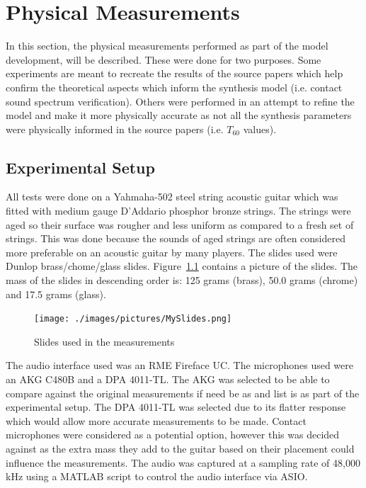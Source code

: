 \documentclass[../main.tex]{subfiles}
\begin{document}
\chapter{Physical Measurements}
In this section, the physical measurements performed as part of the model development, will be described. These were done for two purposes. Some experiments are meant to recreate the results of the source papers which help confirm the theoretical aspects which inform the synthesis model (i.e. contact sound spectrum verification). Others were performed in an attempt to refine the model and make it more physically accurate as not all the synthesis parameters were physically informed in the source papers (i.e. $T_{60}$ values).

\section{Experimental Setup}
All tests were done on a Yahmaha-502 steel string acoustic guitar which was fitted with medium gauge D'Addario phosphor bronze strings. The strings were aged so their surface was rougher and less uniform as compared to a fresh set of strings. This was done because the sounds of aged strings are often considered more preferable on an acoustic guitar by many players. The slides used were Dunlop brass/chome/glass slides. Figure~\ref{fig:MySlides} contains a picture of the slides. The mass of the slides in descending order is: 125 grams (brass), 50.0 grams (chrome) and 17.5 grams (glass). 

\begin{figure}[h]
    \centering
    \texttt{[image: ./images/pictures/MySlides.png]}
    \caption{Slides used in the measurements}
    \label{fig:MySlides}
\end{figure}

The audio interface used was an RME Fireface UC. The microphones used were an AKG C480B and a DPA 4011-TL. The AKG was selected to be able to compare against the original measurements if need be as  and  list is as part of the experimental setup. The DPA 4011-TL was selected due to its flatter response which would allow more accurate measurements to be made. Contact microphones were considered as a potential option, however this was decided against as the extra mass they add to the guitar based on their placement could influence the measurements. The audio was captured at a sampling rate of 48,000 kHz using a MATLAB script to control the audio interface via ASIO.
\end{document}
